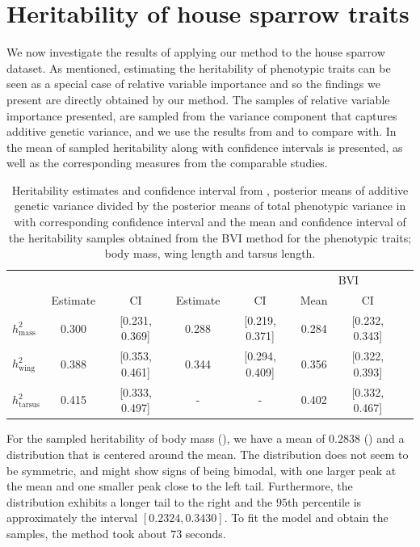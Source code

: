 \section{Heritability of house sparrow traits}
We now investigate the results of applying our method to the house sparrow dataset. As mentioned, estimating the heritability of phenotypic traits can be seen as a special case of relative variable importance and so the findings we present are directly obtained by our method. The samples of relative variable importance presented, are sampled from the variance component that captures additive genetic variance, and we use the results from \citet{Silva2017} and \citet{Muff2019Genetic} to compare with. In  the mean of sampled heritability along with confidence intervals is presented, as well as the corresponding measures from the comparable studies.
\begin{table}[H]
  \centering
  \begin{tabular}{lccccccc}
  \toprule
   & \multicolumn{2}{c}{\citet{Silva2017}} & \multicolumn{2}{c}{\citet{Muff2019Genetic}} & \multicolumn{2}{c}{BVI} \\ 
   \cmidrule(lr){2-3} \cmidrule(lr){4-5} \cmidrule(lr){6-7}
   & Estimate & CI & Estimate & CI & Mean & CI \\ 
  \midrule
  $h^2_{\text{mass}}$    & 0.300 & [0.231, 0.369] & 0.288 & [0.219, 0.371] & 0.284 & [0.232, 0.343] \\
  $h^2_{\text{wing}}$    & 0.388 & [0.353, 0.461] & 0.344 & [0.294, 0.409] & 0.356 & [0.322, 0.393] \\
  $h^2_{\text{tarsus}}$  & 0.415 & [0.333, 0.497] & - & - & 0.402 & [0.332, 0.467] \\ 
  \bottomrule
  \end{tabular}
  \caption{Heritability estimates and confidence interval from \citet{Silva2017}, posterior means of additive genetic variance divided by the posterior means of total phenotypic variance in \citet{Muff2019Genetic} with corresponding confidence interval and the mean and confidence interval of the heritability samples obtained from the BVI method for the phenotypic traits; body mass, wing length and tarsus length.}
  \label{table:summary_heritability}
\end{table}
\noindent For the sampled heritability of body mass (), we have a mean of $0.2838$ () and a distribution that is centered around the mean. The distribution does not seem to be symmetric, and might show signs of being bimodal, with one larger peak at the mean and one smaller peak close to the left tail. Furthermore, the distribution exhibits a longer tail to the right and the $95$th percentile is approximately the interval $[0.2324, 0.3430]$. To fit the model and obtain the samples, the method took about $73$ seconds.

